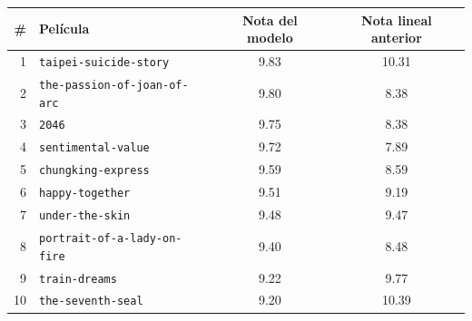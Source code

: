 \begin{tabular}{rlcc}
\toprule
\# & Película & Nota del modelo & Nota lineal anterior \\
\midrule
1 & \texttt{taipei-suicide-story} & 9.83 & 10.31 \\
2 & \texttt{the-passion-of-joan-of-arc} & 9.80 & 8.38 \\
3 & \texttt{2046} & 9.75 & 8.38 \\
4 & \texttt{sentimental-value} & 9.72 & 7.89 \\
5 & \texttt{chungking-express} & 9.59 & 8.59 \\
6 & \texttt{happy-together} & 9.51 & 9.19 \\
7 & \texttt{under-the-skin} & 9.48 & 9.47 \\
8 & \texttt{portrait-of-a-lady-on-fire} & 9.40 & 8.48 \\
9 & \texttt{train-dreams} & 9.22 & 9.77 \\
10 & \texttt{the-seventh-seal} & 9.20 & 10.39 \\
\bottomrule
\end{tabular}
